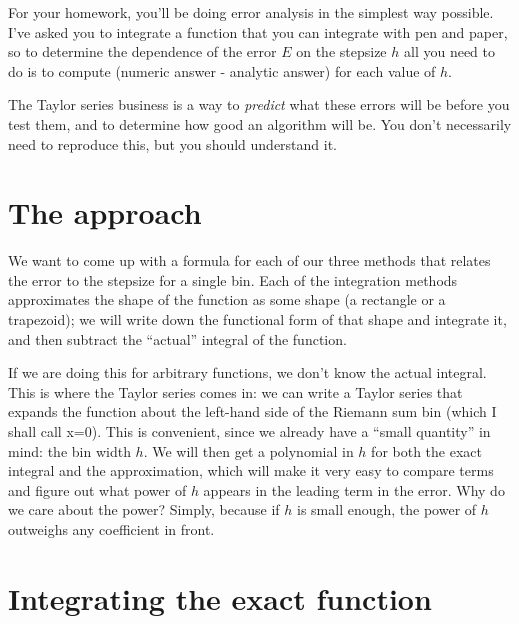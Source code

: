 \documentclass[12ampt]{article}   %
\begin{document}
\Large
\centerline{} 
\normalsize

For your homework, you'll be doing error analysis in the simplest way possible. I've asked you to integrate a function that you can integrate with pen and paper, so 
to determine the dependence of the error $E$ on the stepsize $h$ all you need to do is to compute (numeric answer - analytic answer) for each value of $h$.

The Taylor series business is a way to {\it predict} what these errors will be before you test them, and to determine how good an algorithm will be. You don't necessarily
need to reproduce this, but you should understand it.

\section{The approach}

We want to come up with a formula for each of our three methods that relates the error to the stepsize for a single bin. Each of the integration methods approximates the 
shape of the function as some shape (a rectangle or a trapezoid); we will write down the functional form of that shape and integrate it, and then subtract the ``actual'' integral
of the function.

If we are doing this for arbitrary functions, we don't know the actual integral. This is where the Taylor series comes in: we can write a Taylor series that expands the function
about the left-hand side of the Riemann sum bin (which I shall call x=0). This is convenient, since we already have a ``small quantity'' in mind: the bin width $h$. We will then
get a polynomial in $h$ for both the exact integral and the approximation, which will make it very easy to compare terms and figure out what power of $h$ appears in the leading term
in the error. Why do we care about the power? Simply, because if $h$ is small enough, the power of $h$ outweighs any coefficient in front.

\section{Integrating the exact function}
\end{document}
